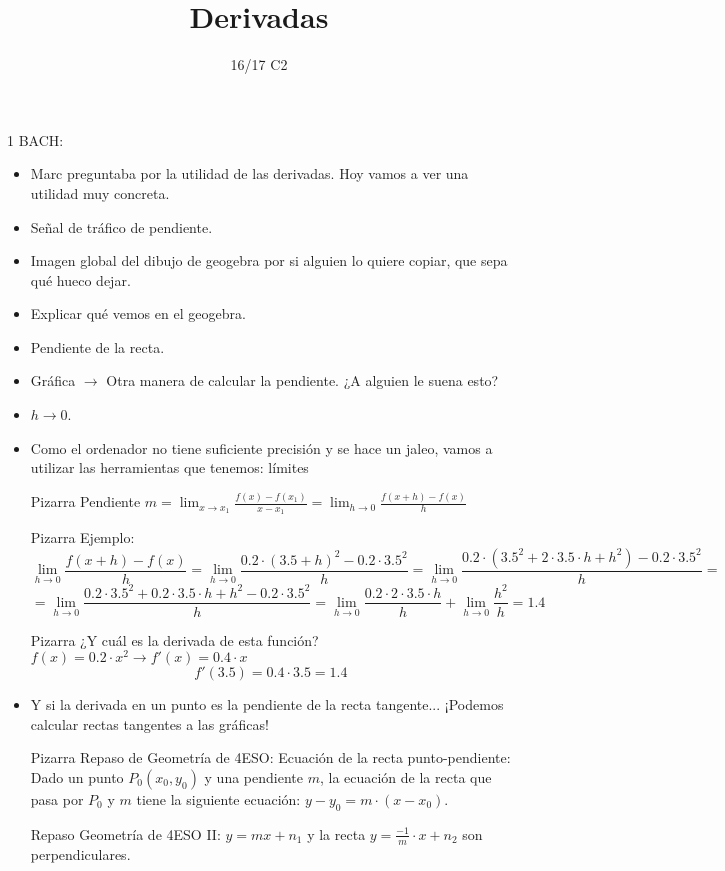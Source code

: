 \documentclass[palatino,nosec]{apuntes}
\title{Derivadas}
\author{}
\date{16/17 C2}
\begin{document}


1 BACH:

\begin{itemize}
\item Marc preguntaba por la utilidad de las derivadas. Hoy vamos a ver una utilidad muy concreta.

\item Señal de tráfico de pendiente.
\item Imagen global del dibujo de geogebra por si alguien lo quiere copiar, que sepa qué hueco dejar.
\item Explicar qué vemos en el geogebra. 
\item Pendiente de la recta.
\item Gráfica $\to$ Otra manera de calcular la pendiente. ¿A alguien le suena esto?
\item $h \to 0$.
\item Como el ordenador no tiene suficiente precisión y se hace un jaleo, vamos a utilizar las herramientas que tenemos: límites
\item [Pizarra] Pendiente $m = \lim_{x\to x_1} \frac{f(x) - f(x_1)}{x-x_1} = \lim_{h\to 0} \frac{f(x+h)-f(x)}{h}$
\item [Pizarra] Ejemplo: \[\lim_{h\to 0}\frac{f(x+h)-f(x)}{h} = \lim_{h\to 0} \frac{0.2·(3.5+h)^2 - 0.2·3.5^2}{h} = \lim_{h\to 0} \frac{0.2·(3.5^2+2·3.5·h+h^2) - 0.2·3.5^2}{h} = 
\]
\[
= \lim_{h\to 0} \frac{0.2·3.5^2+0.2·3.5·h+h^2-0.2·3.5^2}{h} = \lim_{h\to 0}\frac{0.2·2·3.5·h}{h} + \lim_{h\to 0}\frac{h^2}{h} = 1.4
\]

\item[Pizarra] ¿Y cuál es la derivada de esta función? $f(x) = 0.2·x^2 \to f'(x) = 0.4·x$ \[f'(3.5) = 0.4·3.5 = 1.4\]

\item Y si la derivada en un punto es la pendiente de la recta tangente... ¡Podemos calcular rectas tangentes a las gráficas!

\item[Pizarra]
Repaso de Geometría de 4ESO: Ecuación de la recta punto-pendiente: Dado un punto $P_0(x_0,y_0)$ y una pendiente $m$, la ecuación de la recta que pasa por $P_0$ y $m$ tiene la siguiente ecuación: $y-y_0=m·(x-x_0)$.

Repaso Geometría de 4ESO II: $y=mx+n_1$ y la recta $y=\frac{-1}{m}·x + n_2$ son perpendiculares.



\end{itemize}
\end{document}
